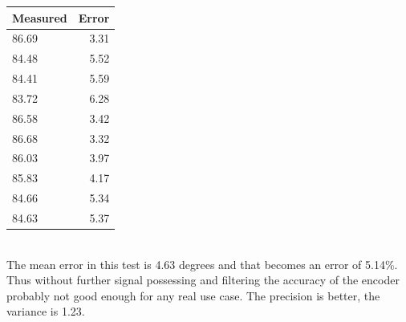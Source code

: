 \documentclass[10pt,a4paper]{article}
\begin{document}

\begin{tabular}{ | l | r |}
\hline
\textbf{Measured} & \textbf{Error} \\
\hline
 86.69 & 3.31 \\
\hline
 84.48 & 5.52 \\
\hline
 84.41 & 5.59 \\
\hline
 83.72 & 6.28 \\
\hline
 86.58 & 3.42\\
\hline
 86.68 & 3.32\\
\hline
86.03 & 3.97\\
\hline
85.83 & 4.17\\
\hline
84.66 & 5.34\\
\hline
84.63 & 5.37\\
\hline
\end{tabular} \\ 


The mean error in this test is 4.63 degrees and that becomes an error of 5.14\%. Thus without further signal possessing and filtering the accuracy of the encoder probably not good enough for any real use case. The precision is better, the variance is 1.23.\\
\end{document}
